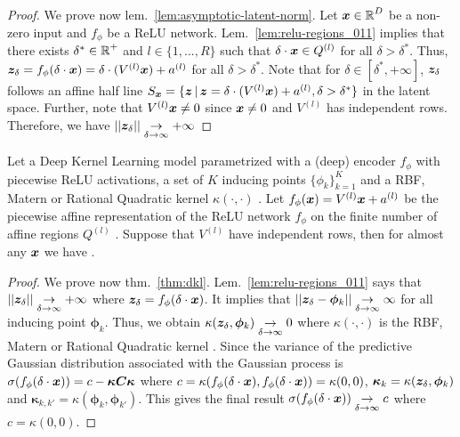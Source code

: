 \begin{proof}
We prove now lem.~\ref{lem:asymptotic-latent-norm}. Let $\bm{x} \in \operatorname{\mathbb{R}}^D $ be a non-zero input and $f_{\phi}$ be a ReLU network. Lem.~\ref{lem:relu-regions_011} implies that there exists $\delta^* \in \operatorname{\mathbb{R}}^{+}$ and $l \in \{1,..., R\}$ such that $\delta \cdot \bm{x} \in Q^{(l)}$ for all $\delta > \delta^*$. Thus, $\bm{z}_{\delta} = f_{\phi}(\delta \cdot \bm{x}) = \delta \cdot (V^{(l)} \bm{x}) + a^{(l)}$ for all $\delta > \delta^*$. Note that for $\delta\in [\delta^*, +\infty]$,  $\bm{z}_{\delta}$ follows an affine half line $S_{\bm{x}} = \{\bm{z} \,|\, \bm{z} = \delta \cdot (V^{(l)} \bm{x}) + a^{(l)}, \delta > \delta^* \}$ in the latent space. Further, note that $V^{(l)}\bm{x} \neq 0$ since $\bm{x} \neq 0$ and $V^{(l)}$ has independent rows. Therefore, we have $|| \bm{z}_\delta|| \underset{\delta \rightarrow \infty}{\rightarrow} + \infty$
\end{proof}

\begin{theorem}
\label{thm:dkl}
Let a Deep Kernel Learning model parametrized with a (deep) encoder $f_{\phi}$ with piecewise ReLU activations, a set of $K$ inducing points $\{\phi_{k}\}_{k=1}^{K}$ and a RBF, Matern or Rational Quadratic kernel $\kappa(\cdot, \cdot)$ \cite{expressing-structure-kernels, gp-for-ml}. Let $f_{\phi}(\bm{x})= V^{(l)}\bm{x} + a^{(l)}$ be the piecewise affine representation of the ReLU network $f_{\phi}$ on the finite number of affine regions $Q^{(l)}$ \citep{understanding-nn-relu}. Suppose that $V^{(l)}$ have independent rows, then for almost any $\bm{x}$ we have .
\end{theorem}

\begin{proof}
We prove now thm.~\ref{thm:dkl}. Lem.~\ref{lem:relu-regions_011} says that $||\bm{z}_\delta|| \underset{\delta \rightarrow \infty}{\rightarrow} + \infty$ where $\bm{z}_\delta=f_{\phi}(\delta \cdot \bm{x})$. It implies that $||\bm{z}_\delta - \bm{\phi}_k|| \underset{\delta \rightarrow \infty}{\rightarrow} \infty$ for all inducing point $\bm{\phi}_k$. Thus, we obtain $\kappa(\bm{z}_\delta, \bm{\phi}_k) \underset{\delta \rightarrow \infty}{\rightarrow} 0$ where $\kappa(\cdot, \cdot)$ is the RBF, Matern or Rational Quadratic kernel \cite{expressing-structure-kernels, gp-for-ml}. Since the variance of the predictive Gaussian distribution associated with the Gaussian process is $\sigma(f_{\phi}(\delta \cdot \bm{x})) = c - \bm{\kappa} \bm{C} \bm{\kappa}$ where $c = \kappa(f_{\phi}(\delta \cdot \bm{x}), f_{\phi}(\delta \cdot \bm{x})) = \kappa(0, 0)$, $\bm{\kappa}_k = \kappa(\bm{z}_\delta, \bm{\phi}_{k})$ and $\bm{\kappa}_{k, k'} = \kappa(\bm{\phi}_{k}, \bm{\phi}_{k'})$. This gives the final result $\sigma(f_{\phi}(\delta \cdot \bm{x})) \underset{\delta \rightarrow \infty}{\rightarrow} c$ where $ c = \kappa(0, 0)$.
\end{proof}

